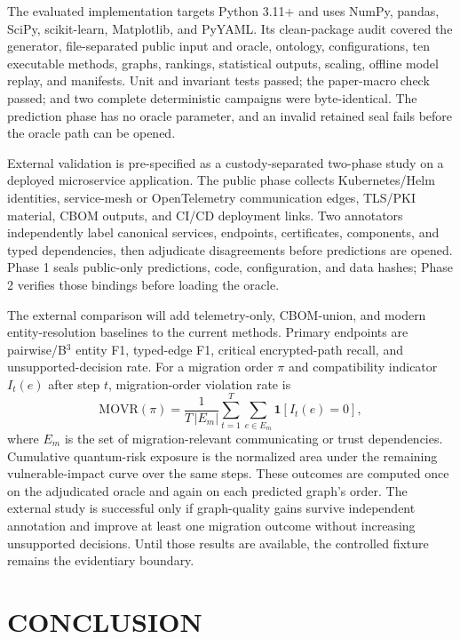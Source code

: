 \documentclass[a4paper,twoside]{article}
\begin{document}
The evaluated implementation targets Python 3.11+ and uses NumPy, pandas, SciPy, scikit-learn, Matplotlib, and PyYAML. Its clean-package audit covered the generator, file-separated public input and oracle, ontology, configurations, ten executable methods, graphs, rankings, statistical outputs, scaling, offline model replay, and manifests. Unit and invariant tests passed; the paper-macro check passed; and two complete deterministic campaigns were byte-identical. The prediction phase has no oracle parameter, and an invalid retained seal fails before the oracle path can be opened.

External validation is pre-specified as a custody-separated two-phase study on a deployed microservice application. The public phase collects Kubernetes/Helm identities, service-mesh or OpenTelemetry communication edges, TLS/PKI material, CBOM outputs, and CI/CD deployment links. Two annotators independently label canonical services, endpoints, certificates, components, and typed dependencies, then adjudicate disagreements before predictions are opened. Phase 1 seals public-only predictions, code, configuration, and data hashes; Phase 2 verifies those bindings before loading the oracle.

The external comparison will add telemetry-only, CBOM-union, and modern entity-resolution baselines to the current methods. Primary endpoints are pairwise/B$^3$ entity F1, typed-edge F1, critical encrypted-path recall, and unsupported-decision rate. For a migration order $\pi$ and compatibility indicator $I_t(e)$ after step $t$, migration-order violation rate is
\begin{equation}
\mathrm{MOVR}(\pi) = \frac{1}{T\,|E_m|} \sum_{t=1}^{T} \sum_{e \in E_m} \mathbf{1}[I_t(e) = 0] ,
\label{eq:movr}
\end{equation}
where $E_m$ is the set of migration-relevant communicating or trust dependencies. Cumulative quantum-risk exposure is the normalized area under the remaining vulnerable-impact curve over the same steps. These outcomes are computed once on the adjudicated oracle and again on each predicted graph's order. The external study is successful only if graph-quality gains survive independent annotation and improve at least one migration outcome without increasing unsupported decisions. Until those results are available, the controlled fixture remains the evidentiary boundary.

\section{\uppercase{Conclusion}}
\label{sec:conclusion}
\end{document}
